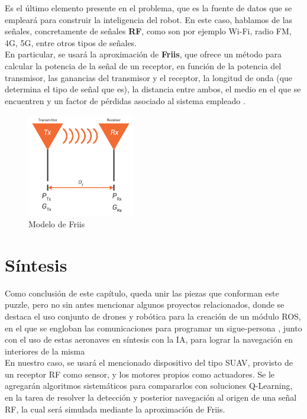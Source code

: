Es el último elemento presente en el problema, que es la fuente de datos que se empleará para construir la inteligencia del robot. En este caso, hablamos de las señales, concretamente de señales \textbf{\ac{RF}}, como son por ejemplo Wi-Fi, radio FM, 4G, 5G, entre otros tipos de señales.\\

En particular, se usará la aproximación de \textbf{Friis}, que ofrece un método para calcular la potencia de la señal de un receptor, en función de la potencia del transmisor, las ganancias del transmisor y el receptor, la longitud de onda (que determina el tipo de señal que es), la distancia entre ambos, el medio en el que se encuentren y un factor de pérdidas asociado al sistema empleado \cite{friis-1} \cite{friis-2} \cite{friis-3}.\\

\begin{figure} [H]
	\begin{center}
	\includegraphics[height=4.5cm]{imagenes/cap1/10_friis.png}
	\end{center}
	\caption[Modelo de Friis]{Modelo de Friis}
	\label{fig:friis}
\end{figure}

\section{Síntesis}
\label{subsec:sintesis}

Como conclusión de este capítulo, queda unir las piezas que conforman este puzzle, pero no sin antes mencionar algunos proyectos relacionados, donde se destaca el uso conjunto de drones y robótica para la creación de un módulo ROS, en el que se engloban las comunicaciones para programar un sigue-persona \cite{tfm-pedro}, junto con el uso de estas aeronaves en síntesis con la \ac{IA}, para lograr la navegación en interiores de la misma \cite{paper-ia-dron}\\

En nuestro caso, se usará el mencionado dispositivo del tipo \ac{SUAV}, provisto de un receptor \ac{RF} como sensor, y los motores propios como actuadores. Se le agregarán algoritmos sistemáticos para compararlos con soluciones Q-Learning, en la tarea de resolver la detección y posterior navegación al origen de una señal \ac{RF}, la cual será simulada mediante la aproximación de Friis.